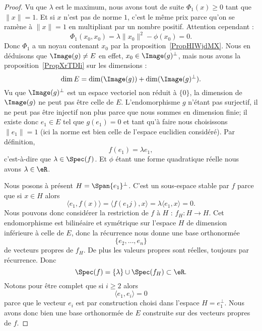 \begin{proof}
    Vu que \( \lambda\) est le maximum, nous avons tout de suite \( \Phi_1(x)\geq 0\) tant que \( \| x \|=1\). Et si \( x\) n'est pas de norme \( 1\), c'est le même prix parce qu'on se ramène à \( \| x \|=1\) en multipliant par un nombre positif. Attention cependant :
    \begin{equation}
        \Phi_1(x_0,x_0)=\lambda\| x_0 \|^2-\phi(x_0)=0.
    \end{equation}
    Donc \( \Phi_1\) a un noyau contenant \( x_0\) par la proposition~\ref{PropHIWjdMX}. Nous en déduisons que \( \Image(g)\neq E\) en effet, \( x_0\in\Image(g)^{\perp}\), mais nous avons la proposition~\ref{PropXrTDIi} sur les dimensions :
    \begin{equation}
        \dim E=\dim(\Image(g))+\dim( \Image(g)^{\perp}).
    \end{equation}
    Vu que \( \Image(g)^{\perp}\) est un espace vectoriel non réduit à \( \{ 0 \}\), la dimension de \( \Image(g)\) ne peut pas être celle de \( E\). L'endomorphisme \( g\) n'étant pas surjectif, il ne peut pas être injectif non plus parce que nous sommes en dimension finie; il existe donc \( e_1\in E\) tel que \( g(e_1)=0\) et tant qu'à faire nous choisissons \( \| e_1 \|=1\) (ici la norme est bien celle de l'espace euclidien considéré). Par définition,
    \begin{equation}
        f(e_1)=\lambda e_1,
    \end{equation}
    c'est-à-dire que \( \lambda\in\Spec(f)\). Et \( \phi\) étant une forme quadratique réelle nous avons \( \lambda\in \eR\).

    Nous posons à présent \( H=\Span\{ e_1 \}^{\perp}\). C'est un sous-espace stable par \( f\) parce que si \( x\in H\) alors
    \begin{equation}
        \langle e_1, f(x)\rangle =\langle f(e_1j),x\rangle =\lambda\langle e_1, x\rangle =0.
    \end{equation}
    Nous pouvons donc considérer la restriction de \( f\) à \( H\) : \( f_H\colon H\to H\). Cet endomorphisme est bilinéaire et symétrique sur l'espace \( H\) de dimension inférieure à celle de \( E\), donc la récurrence nous donne une base orthonormée
    \begin{equation}
        \{ e_2,\ldots, e_n \}
    \end{equation}
    de vecteurs propres de \( f_H\). De plus les valeurs propres sont réelles, toujours par récurrence. Donc
    \begin{equation}
        \Spec(f)=\{ \lambda \}\cup\Spec(f_H)\subset \eR.
    \end{equation}
    Notons pour être complet que si \( i\geq 2\) alors
    \begin{equation}
        \langle e_1, e_i\rangle =0
    \end{equation}
    parce que le vecteur \( e_i\) est par construction choisi dans l'espace \( H=e_1^{\perp}\). Nous avons donc bien une base orthonormée de \( E\) construite sur des vecteurs propres de \( f\).
\end{proof}

